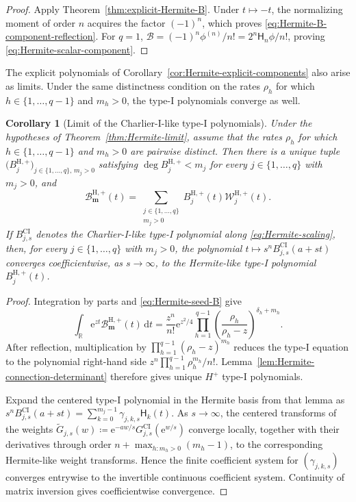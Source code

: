 \documentclass[10pt]{amsart}
\newcommand{\e}{\mathrm e}
\newcommand{\dd}{\,\mathrm d}
\newcommand{\mm}{\boldsymbol m}
\theoremstyle{plain}
\newtheorem{corollary}[theorem]{Corollary}
\theoremstyle{definition}
\theoremstyle{remark}
\begin{document}
\begin{proof}
Apply Theorem~\ref{thm:explicit-Hermite-B}.  Under \(t\mapsto-t\), the
normalizing moment of order \(n\) acquires the factor \((-1)^n\), which
proves \eqref{eq:Hermite-B-component-reflection}.  For \(q=1\),
\(\mathcal B=(-1)^n\phi^{(n)}/n!=2^n\mathsf H_n\phi/n!\), proving
\eqref{eq:Hermite-scalar-component}.
\end{proof}

The explicit polynomials of Corollary~\ref{cor:Hermite-explicit-components}
also arise as limits. Under the same distinctness condition on the rates \(\rho_h\) for which
\(h\in\{1,\ldots,q-1\}\) and \(m_h>0\), the type-I polynomials converge
as well.

\begin{corollary}[Limit of the Charlier-I-like type-I polynomials]
\label{cor:CI-Hermite-components}
Under the hypotheses of Theorem~\ref{thm:Hermite-limit}, assume that the
rates \(\rho_h\) for which \(h\in\{1,\ldots,q-1\}\) and \(m_h>0\) are
pairwise distinct.
Then there is a unique tuple
\(\bigl(B_j^{\mathrm H,+}\bigr)_{
 j\in\{1,\ldots,q\},\,m_j>0}\) satisfying
\(\deg B_j^{\mathrm H,+}<m_j\) for every
\(j\in\{1,\ldots,q\}\) with \(m_j>0\), and
\[
 \mathcal B_{\mm}^{\mathrm H,+}(t)
 =\sum_{\substack{j\in\{1,\ldots,q\}\\m_j>0}}
 B_j^{\mathrm H,+}(t)
 \mathcal W_j^{\mathrm H,+}(t).
\]
If
\(B_{j,s}^{\mathrm{CI}}\) denotes the Charlier-I-like type-I polynomial along
\eqref{eq:Hermite-scaling}, then, for every
\(j\in\{1,\ldots,q\}\) with \(m_j>0\), the polynomial
\(t\mapsto s^nB_{j,s}^{\mathrm{CI}}(a+st)\) converges coefficientwise, as
\(s\to\infty\), to
the Hermite-like type-I polynomial
\(B_j^{\mathrm H,+}(t)\).
\end{corollary}

\begin{proof}
Integration by parts and \eqref{eq:Hermite-seed-B} give
\[
 \int_{\mathbb R}\e^{zt}\mathcal B_{\mm}^{\mathrm H,+}(t)\dd t
 =\frac{z^n}{n!}\e^{z^2/4}
 \prod_{h=1}^{q-1}\left(\frac{\rho_h}{\rho_h-z}\right)^{\delta_h+m_h}.
\]
After reflection, multiplication by
\(\prod_{h=1}^{q-1}(\rho_h-z)^{m_h}\) reduces the type-I equation to the
polynomial right-hand side \(z^n\prod_{h=1}^{q-1}\rho_h^{m_h}/n!\).
Lemma~\ref{lem:Hermite-connection-determinant} therefore gives unique
\(H^+\) type-I polynomials.

Expand the centered type-I polynomial in the Hermite basis from that lemma as
\(s^nB_{j,s}^{\mathrm{CI}}(a+st)
=\sum_{k=0}^{m_j-1}\gamma_{j,k,s}\mathsf H_k(t)\).
As \(s\to\infty\), the centered transforms of the weights
\(\widetilde G_{j,s}(w)
\coloneq\e^{-aw/s}G_{j,s}^{\mathrm{CI}}(\e^{w/s})\)
converge locally, together with their derivatives through order
\(n+\max_{h:m_h>0}(m_h-1)\), to
the corresponding Hermite-like weight transforms. Hence the finite
coefficient system for \((\gamma_{j,k,s})\) converges entrywise to the
invertible continuous coefficient system. Continuity of matrix inversion
gives coefficientwise convergence.
\end{proof}
\end{document}
